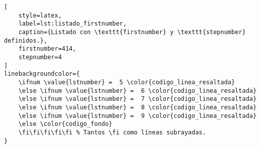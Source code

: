\begin{lstlisting}[
	style=latex,
	label=lst:listado_firstnumber,
	caption={Listado con \texttt{firstnumber} y \texttt{stepnumber} definidos.},
	firstnumber=414,
	stepnumber=4
]
linebackgroundcolor={
	\ifnum \value{lstnumber} =  5 \color{codigo_linea_resaltada}
	\else \ifnum \value{lstnumber} =  6 \color{codigo_linea_resaltada}
	\else \ifnum \value{lstnumber} =  7 \color{codigo_linea_resaltada}
	\else \ifnum \value{lstnumber} =  8 \color{codigo_linea_resaltada}
	\else \ifnum \value{lstnumber} =  9 \color{codigo_linea_resaltada}
	\else \color{codigo_fondo}
	\fi\fi\fi\fi\fi % Tantos \fi como líneas subrayadas.
}
\end{lstlisting}